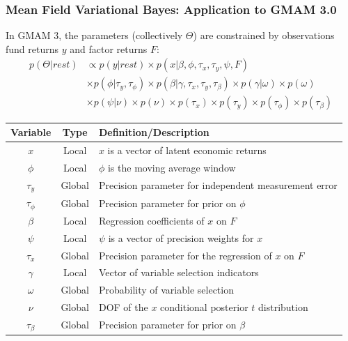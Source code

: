 \documentclass[10pt, compress]{beamer}
\begin{document}
\begin{frame}[fragile]
\frametitle{Mean Field Variational Bayes: Application to GMAM 3.0}

In GMAM 3, the parameters (collectively $\Theta$) are constrained by observations fund returns $y$ and factor returns $F$:
\begin{align*}
    p\left(\Theta|rest\right)& \propto p(y|rest)\times p\left(x|\beta,\phi,\tau_{x},\tau_{y},\psi,F\right)\\
    &\times p\left(\phi|\tau_{y},\tau_{\phi}\right)\times p\left(\beta|\gamma,\tau_{x},\tau_{y},\tau_{\beta}\right)\times p\left(\gamma|\omega\right)\times p\left(\omega\right)\\
    &\times p\left(\psi|\nu\right)\times p\left(\nu\right)\times p\left(\tau_{x}\right)\times p\left(\tau_{y}\right)\times p\left(\tau_{\phi}\right)\times p\left(\tau_{\beta}\right)
\end{align*}

\begin{table}
\scriptsize

\vspace{-10pt}   
    \begin{tabular}{ccl}
    \toprule 
        Variable & Type & Definition/Description\tabularnewline
        \midrule
            $x$ & Local & $x$ is a vector of latent economic returns\tabularnewline
            $\phi$ & Local & $\phi$ is the moving average window\tabularnewline
            $\tau_{y}$ & Global & Precision parameter for independent measurement error\tabularnewline
            $\tau_\phi$ & Global & Precision parameter for prior on $\phi$\tabularnewline
            $\beta$ & Local & Regression coefficients of $x$ on $F$\tabularnewline
            $\psi$ & Local & $\psi$ is a vector of precision weights for $x$\tabularnewline
            $\tau_{x}$ & Global & Precision parameter for the regression of $x$ on $F$\tabularnewline
            $\gamma$ & Local & Vector of variable selection indicators\tabularnewline
            $\omega$ & Global & Probability of variable selection\tabularnewline
            $\nu$ & Global & DOF of the $x$ conditional posterior $t$ distribution\tabularnewline
            $\tau_\beta$ & Global & Precision parameter for prior on $\beta$\tabularnewline
            
        \bottomrule
    \end{tabular}
\end{table}
\end{frame}
\end{document}
